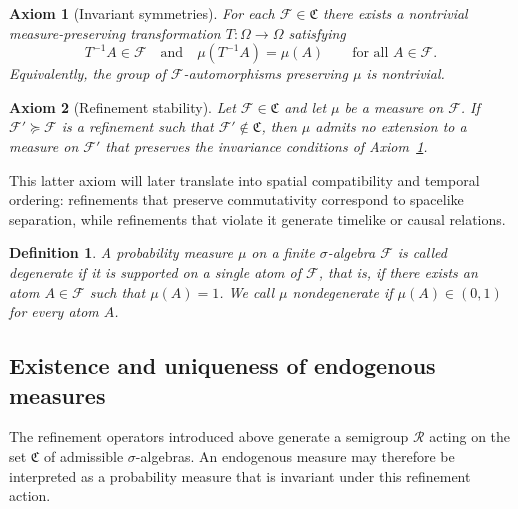 \documentclass[
 amsmath,amssymb,
  onecolumn %
]{revtex4-2}
\newtheorem{definition}[theorem]{Definition}
\newtheorem{axiom}{Axiom}
\begin{document}
\begin{axiom}[Invariant symmetries]\label{ax:B}
For each $\mathcal F\in\mathfrak C$ there exists a nontrivial
measure-preserving transformation
$T:\Omega\to\Omega$ satisfying
\[
T^{-1}A\in\mathcal F
\quad\text{and}\quad
\mu(T^{-1}A)=\mu(A)
\qquad\text{for all }A\in\mathcal F .
\]
Equivalently, the group of $\mathcal F$-automorphisms preserving $\mu$
is nontrivial.
\end{axiom}

\begin{axiom}[Refinement stability]\label{ax:C}
Let $\mathcal F\in\mathfrak C$ and let $\mu$ be a measure on $\mathcal F$.
If $\mathcal F'\succeq\mathcal F$ is a refinement such that
$\mathcal F'\notin\mathfrak C$, then $\mu$ admits no extension to a
measure on $\mathcal F'$ that preserves the invariance conditions of
Axiom~\ref{ax:B}.
\end{axiom}

This latter axiom will later translate into spatial compatibility
and temporal ordering: refinements that preserve commutativity
correspond to spacelike separation, while refinements that violate
it generate timelike or causal relations.

\begin{definition}\label{def:degenerate}
A probability measure $\mu$ on a finite $\sigma$-algebra $\mathcal F$
is called \emph{degenerate} if it is supported on a single atom of $\mathcal F$,
that is, if there exists an atom $A\in\mathcal F$ such that $\mu(A)=1$.
We call $\mu$ \emph{nondegenerate} if $\mu(A)\in(0,1)$ for every atom $A$.
\end{definition}


\subsection{Existence and uniqueness of endogenous measures}
The refinement operators introduced above generate a semigroup
$\mathcal R$ acting on the set $\mathfrak C$ of admissible
$\sigma$-algebras.
An endogenous measure may therefore be interpreted as a probability
measure that is invariant under this refinement action.
\end{document}
